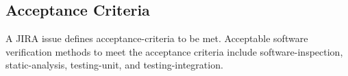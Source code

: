 \subsection{Acceptance Criteria}
A JIRA issue defines \gls{acceptance-criteria} to be met. Acceptable software
verification methods to meet the acceptance criteria include
\gls{software-inspection}, \gls{static-analysis}, \gls{testing-unit}, and
\gls{testing-integration}.
